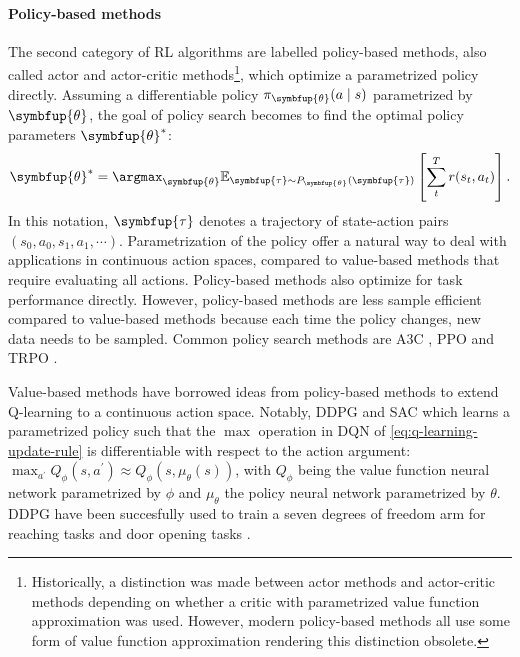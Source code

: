 \documentclass[\home/main.tex]{subfiles}
\begin{document}
\paragraph{Policy-based methods}
The second category of RL algorithms are labelled policy-based methods, also called actor and actor-critic methods\footnote{Historically, a distinction was made between actor methods and actor-critic methods depending on whether a critic with parametrized value function approximation was used. However, modern policy-based methods all use some form of value function approximation rendering this distinction obsolete.}, which optimize a parametrized policy directly. Assuming a differentiable policy $\pi_{\symbfup{\theta}}(a \mid s)$ parametrized by $\symbfup{\theta}$, the goal of policy search becomes to find the optimal policy parameters $\symbfup{\theta}^{*}$:
\begin{equation} \label{eq:policy-max}
	\symbfup{\theta}^{*} = \argmax_{\symbfup{\theta}} \mathbb{E}_{\symbfup{\tau} \sim P_{\symbfup{\theta}}(\symbfup{\tau}) } \left[ \sum_{t}^{T} r(s_t, a_t) \right].
\end{equation}
In this notation, $\symbfup{\tau}$ denotes a trajectory of state-action pairs $(s_0, a_0, s_1, a_1, \cdots)$. Parametrization of the policy offer a natural way to deal with applications in continuous action spaces, compared to value-based methods that require evaluating all actions. Policy-based methods also optimize for task performance directly. However, policy-based methods are less sample efficient compared to value-based methods because each time the policy changes, new data needs to be sampled. Common policy search methods are A3C \autocite{mnih2016asynchronous}, PPO \autocite{schulman2017proximal} and TRPO \autocite{schulman2015trust}.

Value-based methods have borrowed ideas from policy-based methods to extend Q-learning to a continuous action space. Notably, DDPG \autocite{lillicrap2015continuous} and SAC \autocite{haarnoja2018soft} which learns a parametrized policy such that the $\max$ operation in \gls{DQN} of \cref{eq:q-learning-update-rule} is differentiable with respect to the action argument: $\max_{a^{\prime}} Q_{\phi}(s, a^{\prime}) \approx Q_{\phi} (s, \mu_{\theta}(s))$, with $Q_{\phi}$ being the value function neural network parametrized by $\phi$ and $\mu_{\theta}$ the policy neural network parametrized by $\theta$. DDPG have been succesfully used to  train a seven degrees of freedom arm for reaching tasks and door opening tasks \autocite{gu2017deep}.
\end{document}
